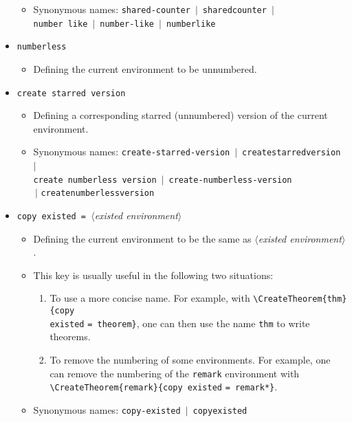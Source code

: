 \documentclass[classical]{einfart}
\providecommand{\meta}[1]{$\langle${\normalfont\itshape#1}$\rangle$}
\newcommand{\commandoption}[1]{\texttt{\textcolor{black!67!cyan}{#1}}}
\begin{document}
\begin{itemize}
\begin{itemize}
            \item Synonymous names: \commandoption{shared-counter} \,$|$\, \commandoption{sharedcounter} \,$|$\, \\\phantom{Synonymous names: }\commandoption{number like} \,$|$\, \commandoption{number-like} \,$|$\, \commandoption{numberlike}
        \end{itemize}
    \item \commandoption{numberless}
        \begin{itemize}
            \item Defining the current environment to be unnumbered.
        \end{itemize}
    \item \commandoption{create starred version}
        \begin{itemize}
            \item Defining a corresponding starred (unnumbered) version of the current environment.
            \item Synonymous names: \commandoption{create-starred-version} \,$|$\, \commandoption{createstarredversion} \,$|$\, \\\phantom{Synonymous names: }\commandoption{create numberless version} \,$|$\, \commandoption{create-numberless-version} \\\phantom{Synonymous names: }\,$|$ \commandoption{createnumberlessversion}
        \end{itemize}
    \item \commandoption{copy existed}\lstinline| = |\meta{existed environment}
        \begin{itemize}
            \item Defining the current environment to be the same as \meta{existed environment}.
            \item This key is usually useful in the following two situations:
                \begin{enumerate}
                    \item To use a more concise name. For example, with \lstinline|\CreateTheorem{thm}{|\commandoption{copy \\existed} \lstinline|= theorem}|, one can then use the name \texttt{thm} to write theorems.
                    \item To remove the numbering of some environments. For example, one can remove the numbering of the \texttt{remark} environment with \lstinline|\CreateTheorem{remark}{|\commandoption{copy existed} \lstinline|= remark*}|.
                \end{enumerate}
            \item Synonymous names: \commandoption{copy-existed} \,$|$\, \commandoption{copyexisted}
        \end{itemize}
\end{itemize}
\end{document}
